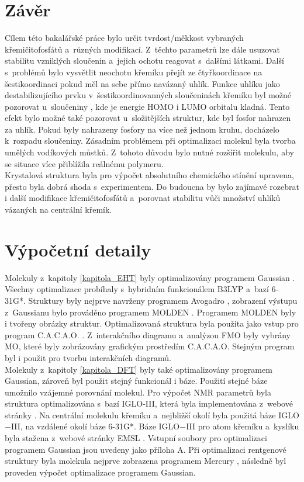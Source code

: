 \documentclass[
  printed, %
  table,   %
  lof,     %
  lot,     %
  oneside,
]{fithesis3}
\begin{document}
  \chapter{Závěr}
Cílem této bakalářské práce bylo určit tvrdost/měkkost vybraných křemičitofosfátů a~různých modifikací. Z~těchto parametrů lze dále usuzovat stabilitu vzniklých sloučenin a~jejich ochotu reagovat s~dalšími látkami. Další s~problémů bylo vysvětlit neochotu křemíku přejít ze čtyřkoordinace na šestikoordinaci pokud měl na sebe přímo navázaný uhlík. Funkce uhlíku jako destabilizujícího prvku v~šestikoordinovanných sloučeninách křemíku byl možné pozorovat u~sloučeniny , kde je energie HOMO i LUMO orbitalu kladná. Tento efekt bylo možné také pozorovat u~složitějších struktur, kde byl fosfor nahrazen za uhlík. Pokud byly nahrazeny fosfory na více než jednom kruhu, docházelo k~rozpadu sloučeniny. Zásadním problémem při optimalizaci molekul byla tvorba umělých vodíkových můstků. Z~tohoto důvodu bylo nutné rozšířit molekulu, aby se situace více přiblížila reálnému polymeru. \\
Krystalová struktura byla pro výpočet absolutního chemického stínění upravena, přesto byla dobrá shoda s~experimentem. Do budoucna by bylo zajímavé rozebrat i další modifikace křemičitofosfátů a~porovnat stabilitu vůči množství uhlíků vázaných na centrální křemík. 
  
  \chapter{Výpočetní detaily}
  Molekuly z~kapitoly \ref{kapitola_EHT} byly optimalizovány programem Gaussian \cite{g09}. Všechny optimalizace probíhaly s~hybridním funkcionálem B3LYP a~bazí 6-31G*. Struktury byly nejprve navrženy programem Avogadro \cite{Avogadro}, zobrazení výstupu z~Gaussianu bylo prováděno programem MOLDEN \cite{Molden}. Programem MOLDEN byly i tvořeny obrázky struktur. Optimalizovaná struktura byla použita jako vstup pro program C.A.C.A.O. \cite{cacao}. Z~interakčního diagramu a~analýzou FMO byly vybrány MO, které byly zobrázovány grafickým prostředím C.A.C.A.O. Stejným program byl i použit pro tvorbu interakčních diagramů. \\
  Molekuly z~kapitoly \ref{kapitola_DFT} byly také optimalizovány programem Gaussian, zároveň byl použit stejný funkcionál i báze. Použití stejné báze umožnilo vzájemné porovnání molekul. Pro výpočet NMR parametrů byla struktura optimalizována s~bazí IGLO-III, která byla implementována z~webové stránky  . Na centrální molekulu křemíku a~nejbližší okolí byla použitá báze IGLO$-$III, na vzdálené okolí báze 6-31G*. Báze IGLO$-$III pro atom křemíku a~kyslíku byla stažena z~webové stránky EMSL \cite{EMSL}. Vstupní soubory pro optimalizaci programem Gaussian jsou uvedeny jako příloha A. Při optimalizaci rentgenové struktury byla molekula nejprve zobrazena programem Mercury \cite{Mercury}, následně byl proveden výpočet optimalizace programem Gaussian.
  
\end{document}
